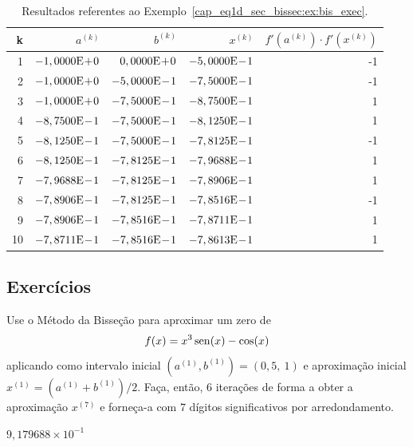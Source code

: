 \begin{ex}
\begin{table}[H]
  \centering
  \caption{Resultados referentes ao Exemplo~\ref{cap_eq1d_sec_bissec:ex:bis_exec}.}
  \begin{tabular}{r|rr|r|r}
    k & $a^{(k)}$ & $b^{(k)}$ & $x^{(k)}$ & $f'(a^{(k)})\cdot f'(x^{(k)})$\\\hline
    1 & $-1,0000\mathrm{E}\!+\!0$ & $0,0000\mathrm{E}\!+\!0$ & $-5,0000\mathrm{E}\!-\!1$ & -1 \\
    2 & $-1,0000\mathrm{E}\!+\!0$ & $-5,0000\mathrm{E}\!-\!1$ & $-7,5000\mathrm{E}\!-\!1$ & -1 \\
    3 & $-1,0000\mathrm{E}\!+\!0$ & $-7,5000\mathrm{E}\!-\!1$ & $-8,7500\mathrm{E}\!-\!1$ & 1 \\
    4 & $-8,7500\mathrm{E}\!-\!1$ & $-7,5000\mathrm{E}\!-\!1$ & $-8,1250\mathrm{E}\!-\!1$ &  1 \\
    5 & $-8,1250\mathrm{E}\!-\!1$ & $-7,5000\mathrm{E}\!-\!1$ & $-7,8125\mathrm{E}\!-\!1$ & -1 \\
    6 & $-8,1250\mathrm{E}\!-\!1$ & $-7,8125\mathrm{E}\!-\!1$ & $-7,9688\mathrm{E}\!-\!1$ & 1 \\
    7 & $-7,9688\mathrm{E}\!-\!1$ & $-7,8125\mathrm{E}\!-\!1$ & $-7,8906\mathrm{E}\!-\!1$ & 1 \\
    8 & $-7,8906\mathrm{E}\!-\!1$ & $-7,8125\mathrm{E}\!-\!1$ & $-7,8516\mathrm{E}\!-\!1$ & -1 \\
    9 & $-7,8906\mathrm{E}\!-\!1$ & $-7,8516\mathrm{E}\!-\!1$ & $-7,8711\mathrm{E}\!-\!1$ & 1 \\
    10 & $-7,8711\mathrm{E}\!-\!1$ & $-7,8516\mathrm{E}\!-\!1$ & $-7,8613\mathrm{E}\!-\!1$ & 1 \\\hline
  \end{tabular}
  \label{cap_eq1d_sec_bissec:tab:bis_multpar}
\end{table}
\end{ex}

\subsection{Exercícios}

\begin{exer}
  Use o Método da Bisseção para aproximar um zero de
  \begin{equation}
    f(x)=x^3\operatorname{sen}(x)-\cos(x)
\end{equation}
aplicando como intervalo inicial $(a^{(1)}, b^{(1)}) = (0,5, ~1)$ e aproximação inicial $x^{(1)}=(a^{(1)}+b^{(1)})/2$. Faça, então, $6$ iterações de forma a obter a aproximação $x^{(7)}$ e forneça-a com $7$ dígitos significativos por arredondamento.
\end{exer}
\begin{resp}
  $9,179688\times 10^{-1}$
\end{resp}

